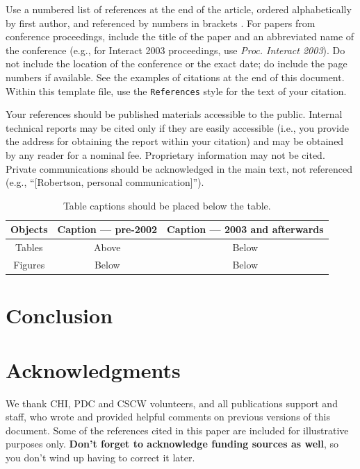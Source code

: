 \documentclass{sigchi}
\newcommand\tabhead[1]{\small\textbf{#1}}
\begin{document}
Use a numbered list of references at the end of the article, ordered
alphabetically by first author, and referenced by numbers in brackets
\cite{ethics,
  Klemmer:2002:WSC:503376.503378,
  Mather:2000:MUT,
  Zellweger:2001:FAO:504216.504224}. For
papers from conference proceedings, include the title of the paper and
an abbreviated name of the conference (e.g., for Interact 2003
proceedings, use \textit{Proc. Interact 2003}). Do not include the
location of the conference or the exact date; do include the page
numbers if available. See the examples of citations at the end of this
document. Within this template file, use the \texttt{References} style
for the text of your citation.

Your references should be published materials accessible to the
public.  Internal technical reports may be cited only if they are
easily accessible (i.e., you provide the address for obtaining the
report within your citation) and may be obtained by any reader for a
nominal fee.  Proprietary information may not be cited. Private
communications should be acknowledged in the main text, not referenced
(e.g., ``[Robertson, personal communication]'').

\begin{table}
  \centering
  \begin{tabular}{|c|c|c|}
    \hline
    \tabhead{Objects} &
    \multicolumn{1}{|p{0.3\columnwidth}|}{\centering\tabhead{Caption --- pre-2002}} &
    \multicolumn{1}{|p{0.4\columnwidth}|}{\centering\tabhead{Caption --- 2003 and afterwards}} \\
    \hline
    Tables & Above & Below \\
    \hline
    Figures & Below & Below \\
    \hline
  \end{tabular}
  \caption{Table captions should be placed below the table.}
  \label{tab:table1}
\end{table}



\section{Conclusion}

\section{Acknowledgments}

We thank CHI, PDC and CSCW volunteers, and all publications support
and staff, who wrote and provided helpful comments on previous
versions of this document.  Some of the references cited in this paper
are included for illustrative purposes only.  \textbf{Don't forget
to acknowledge funding sources as well}, so you don't wind up
having to correct it later.
\end{document}
